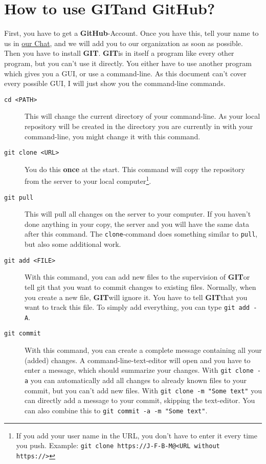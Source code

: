 \documentclass[a4paper]{article}
\newcommand{\git}{\textbf{GIT}}
\newcommand{\github}{\textbf{GitHub}}
\newcommand{\chatlink}{http://chat.stackexchange.com/rooms/17796/collaborative-shared-worlds}
\begin{document}
\newpage

\section{How to use \git and \github ?}

First, you have to get a \github -Account. Once you have this, tell your name to us in \href{\chatlink}{our Chat}, and we will add you to our organization as soon as possible.\\
Then you have to install \git . \git is in itself a program like every other program, but you can't use it directly. You either have to use another program which gives you a GUI, or use a command-line. As this document can't cover every possible GUI, I will just show you the command-line commands.

\begin{description}
	\item[\texttt{cd <PATH>}] This will change the current directory of your command-line. As your local repository will be created in the directory you are currently in with your command-line, you might change it with this command.
	\item[\texttt{git clone <URL>}] You do this \textbf{once} at the start. This command will copy the repository from the server to your local computer\footnote{If you add your user name in the URL, you don't have to enter it every time you push. Example: \texttt{git clone https://J-F-B-M@<URL without https://>}}. 
	\item[\texttt{git pull}] This will pull all changes on the server to your computer. If you haven't done anything in your copy, the server and you will have the same data after this command. The \texttt{clone}-command does something similar to \texttt{pull}, but also some additional work.
	\item[\texttt{git add <FILE>}] With this command, you can add new files to the supervision of \git or tell git that you want to commit changes to existing files. Normally, when you create a new file, \git will ignore it. You have to tell \git that you want to track this file. To simply add everything, you can type \texttt{git add -A}.
	\item[\texttt{git commit}] With this command, you can create a complete message containing all your (added) changes. A command-line-text-editor will open and you have to enter a message, which should summarize your changes. With \texttt{git clone -a} you can automatically add all changes to already known files to your commit, but you can't add new files. With \texttt{git clone -m "Some text"} you can directly add a message to your commit, skipping the text-editor. You can also combine this to \texttt{git commit -a -m "Some text"}.

\end{description}
\end{document}
